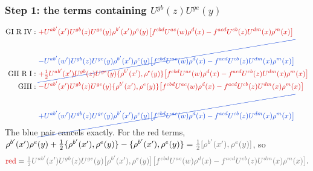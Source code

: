 \documentclass[9pt]{article}
\newcommand{\R}[1]{{\color{cR}#1}}
\newcommand{\B}[1]{{\color{cB}#1}}
\newcommand{\Gr}[1]{{\color{cX}#1}}
\numberwithin{equation}{section}
\begin{document}
\subsubsection*{Step 1: the terms containing $U^{gb}(z)U^{ge}(y)$}
\begin{align}
\text{GI R IV}:\ &\R{+U^{ab'}(x')U^{gb}(z)U^{ge}(y)\rho^{b'}(x')\rho^{e}(y)\big[f^{cbd}U^{ac}(w)\rho^{d}(x)-f^{acd}U^{cb}(z)U^{dm}(x)\rho^{m}(x)\big]}\notag\\
&\B{\cancel{-U^{ab'}(w')U^{gb}(z)U^{ge}(y)\rho^{b'}(x')\rho^{e}(y)\big[f^{cbd}U^{ac}(w)\rho^{d}(x)-f^{acd}U^{cb}(z)U^{dm}(x)\rho^{m}(x)\big]}}\notag\\
\text{GII R I}:\ &\R{+\tfrac12U^{ab'}(x')U^{gb}(z)U^{ge}(y)\{\rho^{b'}(x'),\rho^{e}(y)\}\big[f^{cbd}U^{ac}(w)\rho^{d}(x)-f^{acd}U^{cb}(z)U^{dm}(x)\rho^{m}(x)\big]}\notag\\
\text{GIII}:\ &\R{-U^{ab'}(x')U^{gb}(z)U^{ge}(y)\{\rho^{b'}(x'),\rho^{e}(y)\}\big[f^{cbd}U^{ac}(w)\rho^{d}(x)-f^{acd}U^{cb}(z)U^{dm}(x)\rho^{m}(x)\big]}\notag\\
&\B{\cancel{+U^{ab'}(w')U^{gb}(z)U^{ge}(y)\rho^{b'}(x')\rho^{e}(y)\big[f^{cbd}U^{ac}(w)\rho^{d}(x)-f^{acd}U^{cb}(z)U^{dm}(x)\rho^{m}(x)\big]}}
\end{align}
The \B{blue} pair cancels exactly. For the \R{red} terms, $\rho^{b'}(x')\rho^{e}(y)+\tfrac12\{\rho^{b'}(x'),\rho^{e}(y)\}-\{\rho^{b'}(x'),\rho^{e}(y)\}=\Gr{\tfrac12[\rho^{b'}(x'),\rho^{e}(y)]}$, so
\begin{equation}
\R{\text{red}}=\Gr{\tfrac12U^{ab'}(x')U^{gb}(z)U^{ge}(y)\big[\rho^{b'}(x'),\rho^{e}(y)\big]\big[f^{cbd}U^{ac}(w)\rho^{d}(x)-f^{acd}U^{cb}(z)U^{dm}(x)\rho^{m}(x)\big]}.
\end{equation}
\end{document}
